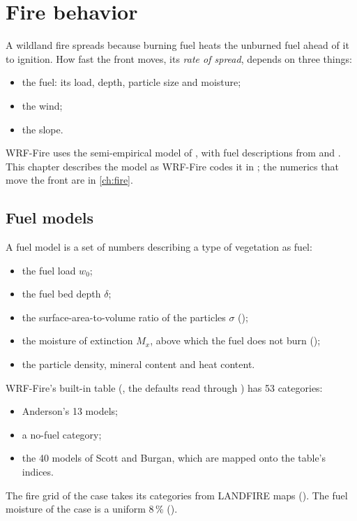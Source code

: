 \chapter{Fire behavior}\label{ch:firebasics}

A wildland fire spreads because burning fuel heats the unburned fuel ahead of it to ignition. How fast the front
moves, its \emph{rate of spread}, depends on three things:
\begin{itemize}
  \item the fuel: its load, depth, particle size and moisture;
  \item the wind;
  \item the slope.
\end{itemize}
WRF-Fire uses the semi-empirical model of \citet{rothermel1972}, with fuel descriptions from \citet{anderson1982} and
\citet{scott2005}. This chapter describes the model as WRF-Fire codes it in ; the
numerics that move the front are in \cref{ch:fire}.

\section{Fuel models}

A fuel model is a set of numbers describing a type of vegetation as fuel:
\begin{itemize}
  \item the fuel load $w_0$;
  \item the fuel bed depth $\delta$;
  \item the surface-area-to-volume ratio of the particles $\sigma$ ();
  \item the moisture of extinction $M_x$, above which the fuel does not burn ();
  \item the particle density, mineral content and heat content.
\end{itemize}
WRF-Fire's built-in table (, the defaults read through ) has 53
categories:
\begin{itemize}
  \item Anderson's 13 models;
  \item a no-fuel category;
  \item the 40 models of Scott and Burgan, which are mapped onto the table's indices.
\end{itemize}
The fire grid of the case takes its categories from LANDFIRE maps (). The fuel moisture of the case
is a uniform 8\,\% ().

